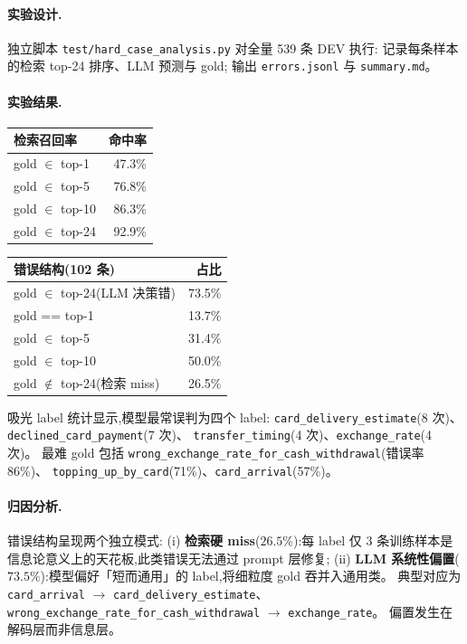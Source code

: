 \documentclass[11pt,a4paper]{ctexart}
\begin{document}
\paragraph{实验设计.}独立脚本 \texttt{test/hard\_case\_analysis.py} 对全量 539 条 DEV 执行:
记录每条样本的检索 top-24 排序、LLM 预测与 gold;
输出 \texttt{errors.jsonl} 与 \texttt{summary.md}。

\paragraph{实验结果.}

\begin{table}[h]
\centering
\small
\begin{tabular}{lr}
\toprule
\textbf{检索召回率} & \textbf{命中率} \\
\midrule
gold $\in$ top-1  & 47.3\% \\
gold $\in$ top-5  & 76.8\% \\
gold $\in$ top-10 & 86.3\% \\
gold $\in$ top-24 & 92.9\% \\
\bottomrule
\end{tabular}
\quad
\begin{tabular}{lr}
\toprule
\textbf{错误结构(102 条)} & \textbf{占比} \\
\midrule
gold $\in$ top-24(LLM 决策错)& 73.5\% \\
\quad gold == top-1          & 13.7\% \\
\quad gold $\in$ top-5       & 31.4\% \\
\quad gold $\in$ top-10      & 50.0\% \\
gold $\notin$ top-24(检索 miss)& 26.5\% \\
\bottomrule
\end{tabular}
\end{table}

\noindent 吸光 label 统计显示,模型最常误判为四个 label:
\texttt{card\_delivery\_estimate}(8 次)、\texttt{declined\_card\_payment}(7 次)、
\texttt{transfer\_timing}(4 次)、\texttt{exchange\_rate}(4 次)。
最难 gold 包括 \texttt{wrong\_exchange\_rate\_for\_cash\_withdrawal}(错误率 86\%)、
\texttt{topping\_up\_by\_card}(71\%)、\texttt{card\_arrival}(57\%)。

\paragraph{归因分析.}错误结构呈现两个独立模式:
(i) \textbf{检索硬 miss}($26.5\%$):每 label 仅 3 条训练样本是信息论意义上的天花板,此类错误无法通过 prompt 层修复;
(ii) \textbf{LLM 系统性偏置}($73.5\%$):模型偏好「短而通用」的 label,将细粒度 gold 吞并入通用类。
典型对应为 \texttt{card\_arrival} $\to$ \texttt{card\_delivery\_estimate}、
\texttt{wrong\_exchange\_rate\_for\_cash\_withdrawal} $\to$ \texttt{exchange\_rate}。
偏置发生在解码层而非信息层。
\end{document}
